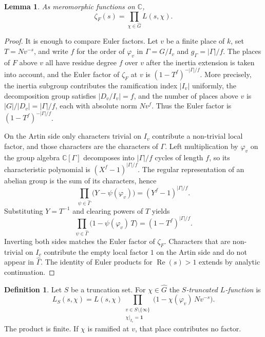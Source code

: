 \documentclass[11pt]{article}
\theoremstyle{plain}
\newtheorem{lemma}[theorem]{Lemma}
\theoremstyle{definition}
\newtheorem{definition}[theorem]{Definition}
\theoremstyle{remark}
\newcommand{\C}{\mathbb{C}}
\newcommand{\triv}{\mathbf{1}}
\begin{document}
\begin{lemma}
\label{lem:artin}
As meromorphic functions on $\C$,
\[
  \zeta_F(s)=\prod_{\chi\in\widehat G}L(s,\chi).
\]
\end{lemma}

\begin{proof}
It is enough to compare Euler factors.
Let $v$ be a finite place of $k$, set $T=Nv^{-s}$, and write $f$ for the order of $\varphi_v$ in $\Gamma=G/I_v$ and $g_{\Gamma}=|\Gamma|/f$.
The places of $F$ above $v$ all have residue degree $f$ over $v$ after the inertia extension is taken into account, and the Euler factor of $\zeta_F$ at $v$ is $(1-T^{f})^{-|\Gamma|/f}$.
More precisely, the inertia subgroup contributes the ramification index $|I_v|$ uniformly, the decomposition group satisfies $|D_v/I_v|=f$, and the number of places above $v$ is $|G|/|D_v|=|\Gamma|/f$, each with absolute norm $Nv^{f}$.
Thus the Euler factor is $(1-T^{f})^{-|\Gamma|/f}$.

On the Artin side only characters trivial on $I_v$ contribute a non-trivial local factor, and those characters are the characters of $\Gamma$.
Left multiplication by $\varphi_v$ on the group algebra $\C[\Gamma]$ decomposes into $|\Gamma|/f$ cycles of length $f$, so its characteristic polynomial is $(X^{f}-1)^{|\Gamma|/f}$.
The regular representation of an abelian group is the sum of its characters, hence
\[
  \prod_{\psi\in\widehat\Gamma}\bigl(Y-\psi(\varphi_v)\bigr)=(Y^{f}-1)^{|\Gamma|/f}.
\]
Substituting $Y=T^{-1}$ and clearing powers of $T$ yields
\[
  \prod_{\psi\in\widehat\Gamma}\bigl(1-\psi(\varphi_v)\,T\bigr)=(1-T^{f})^{|\Gamma|/f}.
\]
Inverting both sides matches the Euler factor of $\zeta_F$.
Characters that are non-trivial on $I_v$ contribute the empty local factor $1$ on the Artin side and do not appear in $\widehat\Gamma$.
The identity of Euler products for $\operatorname{Re}(s)>1$ extends by analytic continuation.
\end{proof}

\begin{definition}
\label{def:trunc}
Let $S$ be a truncation set.
For $\chi\in\widehat G$ the \emph{$S$-truncated $L$-function} is
\begin{equation}
\label{eq:LS}
  L_S(s,\chi)
  =L(s,\chi)\prod_{\substack{v\in S\setminus\{\infty\}\\ \chi|_{I_v}=\triv}}
    \bigl(1-\chi(\varphi_v)\,Nv^{-s}\bigr).
\end{equation}
The product is finite.
If $\chi$ is ramified at $v$, that place contributes no factor.
\end{definition}
\end{document}
